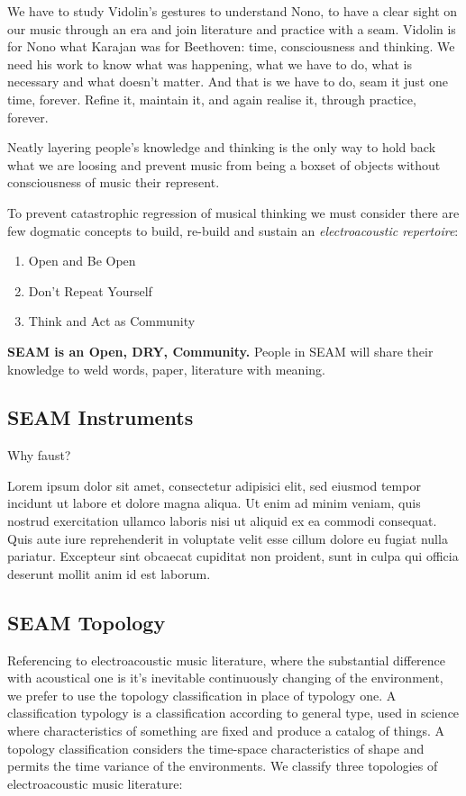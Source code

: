 \documentclass[twoside,a4paper]{article}
\begin{document}
We have to study Vidolin's gestures to understand Nono, to have a clear sight on our music through an era and join literature and practice with a seam. Vidolin is for Nono what Karajan was for Beethoven: time, consciousness and thinking. We need his work to know what was happening, what we have to do, what is necessary and what doesn't matter. And that is we have to do, seam it just one time, forever. Refine it, maintain it, and again realise it, through practice, forever.

Neatly layering people's knowledge and thinking is the only way to hold back what we are loosing and prevent music from being a boxset of objects without consciousness of music their represent. 

To prevent catastrophic regression of musical thinking we must consider there are few dogmatic concepts to build, re-build and sustain an \emph{electroacoustic repertoire}:
\begin{enumerate}
  \item Open and Be Open
  \item Don't Repeat Yourself
  \item Think and Act as Community
\end{enumerate}

\textbf{SEAM is an Open, DRY, Community.} People in SEAM will share their knowledge to weld words, paper, literature with meaning.

\subsection{SEAM Instruments}

Why faust?

Lorem ipsum dolor sit amet, consectetur adipisici elit, sed eiusmod tempor
incidunt ut labore et dolore magna aliqua. Ut enim ad minim veniam, quis
nostrud exercitation ullamco laboris nisi ut aliquid ex ea commodi consequat.
Quis aute iure reprehenderit in voluptate velit esse cillum dolore eu fugiat
nulla pariatur. Excepteur sint obcaecat cupiditat non proident, sunt in culpa
qui officia deserunt mollit anim id est laborum.

\subsection{SEAM Topology}

Referencing to electroacoustic music literature, where the substantial difference with acoustical one is it's inevitable continuously changing of the environment, we prefer to use the topology classification in place of typology one. A classification typology is a classification according to general type, used in science where characteristics of something are fixed and produce a catalog of things. A topology classification considers the time-space characteristics of shape and permits the time variance of the environments. We classify three topologies of electroacoustic music literature: 
\end{document}
